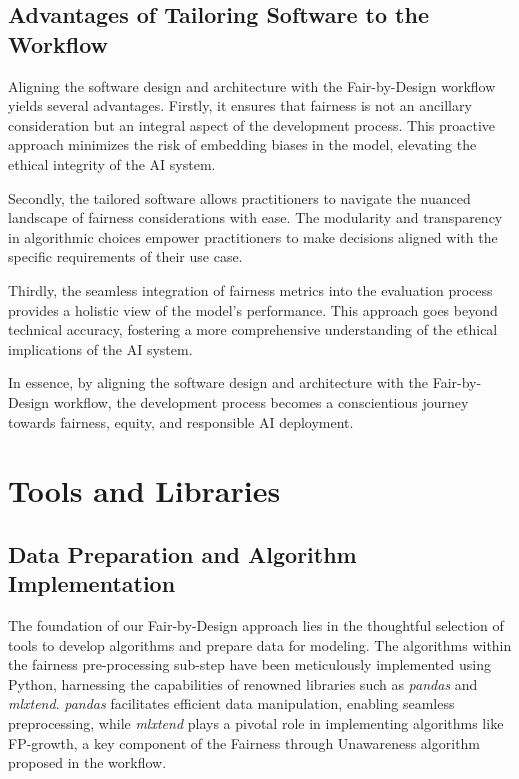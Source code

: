\subsection{Advantages of Tailoring Software to the Workflow}

Aligning the software design and architecture with the Fair-by-Design workflow yields several advantages. Firstly, it ensures that fairness is not an ancillary consideration but an integral aspect of the development process. This proactive approach minimizes the risk of embedding biases in the model, elevating the ethical integrity of the AI system.

Secondly, the tailored software allows practitioners to navigate the nuanced landscape of fairness considerations with ease. The modularity and transparency in algorithmic choices empower practitioners to make decisions aligned with the specific requirements of their use case.

Thirdly, the seamless integration of fairness metrics into the evaluation process provides a holistic view of the model's performance. This approach goes beyond technical accuracy, fostering a more comprehensive understanding of the ethical implications of the AI system.

In essence, by aligning the software design and architecture with the Fair-by-Design workflow, the development process becomes a conscientious journey towards fairness, equity, and responsible AI deployment.






\section{Tools and Libraries}

\subsection{Data Preparation and Algorithm Implementation}

The foundation of our Fair-by-Design approach lies in the thoughtful selection of tools to develop algorithms and prepare data for modeling. The algorithms within the fairness pre-processing sub-step have been meticulously implemented using Python, harnessing the capabilities of renowned libraries such as \emph{pandas} and \emph{mlxtend}. \emph{pandas} facilitates efficient data manipulation, enabling seamless preprocessing, while \emph{mlxtend} plays a pivotal role in implementing algorithms like FP-growth, a key component of the Fairness through Unawareness algorithm proposed in the workflow.

